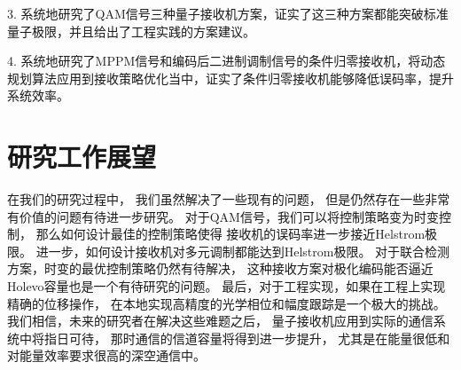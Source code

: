 3. 系统地研究了QAM信号三种量子接收机方案，证实了这三种方案都能突破标准量子极限，并且给出了工程实践的方案建议。

4. 系统地研究了MPPM信号和编码后二进制调制信号的条件归零接收机，将动态规划算法应用到接收策略优化当中，证实了条件归零接收机能够降低误码率，提升系统效率。


\section{研究工作展望}
在我们的研究过程中，
我们虽然解决了一些现有的问题，
但是仍然存在一些非常有价值的问题有待进一步研究。
对于QAM信号，我们可以将控制策略变为时变控制，
那么如何设计最佳的控制策略使得
接收机的误码率进一步接近Helstrom极限。
进一步，如何设计接收机对多元调制都能达到Helstrom极限。
对于联合检测方案，时变的最优控制策略仍然有待解决，
这种接收方案对极化编码能否逼近Holevo容量也是一个有待研究的问题。
最后，对于工程实现，如果在工程上实现精确的位移操作，
在本地实现高精度的光学相位和幅度跟踪是一个极大的挑战。
我们相信，未来的研究者在解决这些难题之后，
量子接收机应用到实际的通信系统中将指日可待，
那时通信的信道容量将得到进一步提升，
尤其是在能量很低和对能量效率要求很高的深空通信中。



